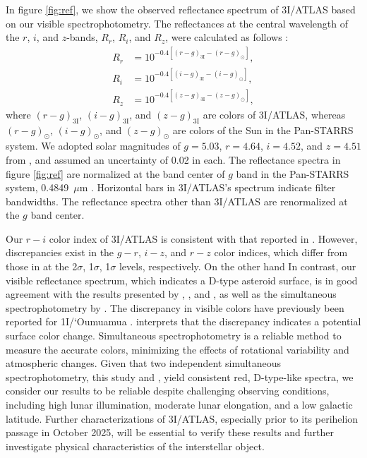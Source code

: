 \documentclass[]{pasj02}
\newcommand\I{3I/ATLAS\xspace}
\begin{document}
In figure \ref{fig:ref}, we show the observed reflectance spectrum of \I based on our visible spectrophotometry.
The reflectances at the central wavelength of the $r$, $i$, and $z$-bands, 
$R_r$, $R_i$, and $R_z$, were calculated as follows \citep[e.g.,][]{DeMeo2013}:
\begin{eqnarray}
    R_r &= 10^{-0.4[(r-g)_{\mathrm{3I}}-(r-g)_\odot]}, \\
    R_i &= 10^{-0.4[(i-g)_{\mathrm{3I}}-(i-g)_\odot]}, \\
    R_z &= 10^{-0.4[(z-g)_{\mathrm{3I}}-(z-g)_\odot]}, 
\end{eqnarray}
where 
$(r-g)_\mathrm{3I}$, $(i-g)_\mathrm{3I}$, and $(z-g)_\mathrm{3I}$ 
are colors of \I,
whereas
$(r-g)_\odot$, $(i-g)_\odot$, and $(z-g)_\odot$ 
are colors of the Sun in the Pan-STARRS system.
We adopted solar magnitudes of $g = 5.03$, $r = 4.64$, $i = 4.52$, and $z = 4.51$ from
\citet{Willmer2018}, and assumed an uncertainty of 0.02 in each.
The reflectance spectra in figure \ref{fig:ref} are normalized at the band center of $g$ band in the Pan-STARRS system, 0.4849~$\mu$m \citep{Willmer2018}.
Horizontal bars in \I's spectrum indicate filter bandwidths.
The reflectance spectra other than \I are renormalized at the $g$ band center.

Our $r-i$ color index of \I is consistent with that reported in \cite{Bolin2025_3I}.
However, discrepancies exist in the $g-r$, $i-z$, and $r-z$ color indices, which differ from those in \citet{Bolin2025_3I} 
at the 2$\sigma$, 1$\sigma$, 1$\sigma$ levels, respectively.
On the other hand
In contrast, our visible reflectance spectrum, which indicates a D-type asteroid surface, is in good agreement with the results presented by \citet{Seligman2025_3I}, \citet{Opitom2025_3I}, and \citet{Marcos2025_3I},
as well as the simultaneous spectrophotometry by \citet{Seligman2025_3I}.
The discrepancy in visible colors have previously been reported for 1I/`Oumuamua \citep{Meech2017, Jewitt2017, Bannister2017}.
\citet{Bannister2017} interprets that the discrepancy indicates a potential surface color change.
Simultaneous spectrophotometry is a reliable method to measure the accurate colors, minimizing the effects of rotational variability and atmospheric changes.
Given that two independent simultaneous spectrophotometry, this study and \citet{Seligman2025_3I}, yield consistent red, D-type-like spectra, 
we consider our results to be reliable despite challenging observing conditions, including high lunar illumination, moderate lunar elongation, and a low galactic latitude.
Further characterizations of 3I/ATLAS, especially prior to its perihelion passage in October 2025, will be essential to verify these results and further investigate physical characteristics of the interstellar object.
\end{document}

